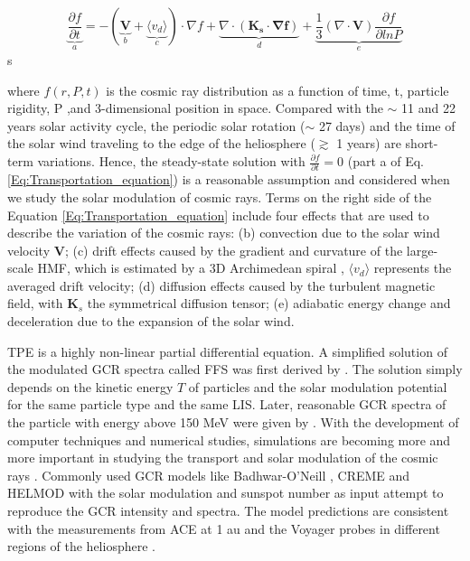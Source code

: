     \begin{equation}
        \underbrace{\frac{\partial f}{\partial t}}_{a} = - ( \underbrace{\boldsymbol{V}}_{b} + \underbrace{\langle v_d \rangle }_{c}) \cdot \nabla f + \underbrace{\nabla \cdot (\boldsymbol{K_s \cdot \nabla f})}_{d} + \underbrace{\frac{1}{3}(\nabla \cdot \boldsymbol{V}) \frac{\partial f}{\partial ln P}}_{e}
        \label{Eq:Transportation_equation}
    \end{equation}s

where $f(r, P, t)$ is the cosmic ray distribution as a function of time, t, particle rigidity, P ,and 3-dimensional position in space. Compared with the $\sim$ 11  and 22 years solar activity cycle, the periodic solar rotation ($\sim$ 27 days) and the time of the solar wind traveling to the edge of the heliosphere ($\gtrsim$ 1 years) are short-term variations. Hence, the steady-state solution with  $\frac{\partial f}{\partial t} = 0$ (part a of Eq.\ref{Eq:Transportation_equation}) is a reasonable assumption and considered when we study the solar modulation of cosmic rays. Terms on the right side of the Equation \ref{Eq:Transportation_equation} include four effects that are used to describe the variation of the cosmic rays: (b) convection due to the solar wind velocity $\boldsymbol{V}$; (c) drift effects caused by the gradient and curvature of the large-scale \ac{HMF}, which is estimated by a 3D Archimedean spiral \citep{Parker-1958}, $\langle v_d \rangle$ represents the averaged drift velocity; (d) diffusion effects caused by the turbulent magnetic field, with $\boldsymbol{K}_s$ the symmetrical diffusion tensor; (e) adiabatic energy change and deceleration due to the expansion of the solar wind. 

\ac{TPE} is a highly non-linear partial differential equation. A simplified solution of the modulated \ac{GCR} spectra called \ac{FFS} was first derived by \citet{Gleeson1967ApJ, Gleeson1968ApJ}. The solution simply depends on the kinetic energy $T$ of particles and the solar modulation potential for the same particle type and the same \ac{LIS}.
Later, reasonable \ac{GCR} spectra of the particle with energy above 150 MeV were given by \citet{Gleeson1973ApSS}.
With the development of computer techniques and numerical studies, simulations are becoming more and more important in studying the transport and solar modulation of the cosmic rays \citep{Jokipii1979ApJ, LeRoux1995ApJ, Manuel2011AdSpR, Potgieter2013LRSP, Vos2015ApJ, Vos2016SoPh,Boschini2019AdSpR, Boschini2022AdSpR, 
Corti2019ApJ, Shen2019ApJ}. 
Commonly used \ac{GCR} models like Badhwar-O'Neill \citep{Oneill2006AdSpR,ONeill2015, Slaba2020SpWea}, CREME \citep{Tylka1997ITNS,Weller2010ITNS} and HELMOD \citep{Boschini2018AdSpR} with the solar modulation and sunspot number as input attempt to reproduce the GCR intensity and spectra. The model predictions are consistent with the measurements from \ac{ACE} at 1 au and the Voyager probes in different regions of the heliosphere \citep{Boschini2019AdSpR}.


